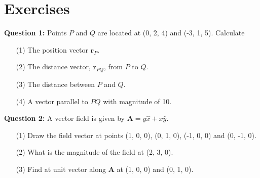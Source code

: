 \documentclass[12pt,a4paper]{article}
\begin{document}
\section{Exercises}
\noindent\textbf{Question 1:} Points $P$ and $Q$ are located at (0, 2, 4) and (-3, 1, 5). Calculate
\begin{enumerate}
\item[(1)] The position vector $\textbf{r}_P$.
\item[(2)] The distance vector, $\textbf{r}_{PQ}$, from $P$ to $Q$.
\item[(3)] The distance between $P$ and $Q$.
\item[(4)] A vector parallel to $PQ$ with magnitude of 10.
\end{enumerate}
\noindent\textbf{Question 2:} A vector field is given by $\textbf{A}=y\hat x+x\hat y$.
\begin{enumerate}
\item[(1)] Draw the field vector at points (1, 0, 0), (0, 1, 0), (-1, 0, 0) and (0, -1, 0).
\item[(2)] What is the magnitude of the field at (2, 3, 0).
\item[(3)] Find at unit vector along \textbf{A} at (1, 0, 0) and (0, 1, 0).
\end{enumerate}


\end{document}
